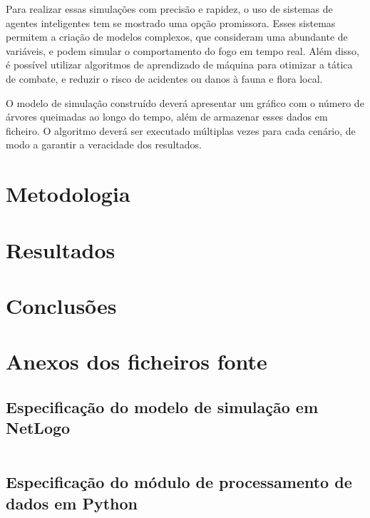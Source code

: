 \documentclass[a4paper, portuguese]{report}
\begin{document}
    Para realizar essas simulações com precisão e rapidez, o uso de sistemas de agentes inteligentes tem se mostrado uma opção promissora.
    Esses sistemas permitem a criação de modelos complexos, que consideram uma abundante de variáveis, e podem simular o comportamento do fogo em tempo real.
    Além disso, é possível utilizar algoritmos de aprendizado de máquina para otimizar a tática de combate, e reduzir o risco de acidentes ou danos à fauna e flora local.

    O modelo de simulação construído deverá apresentar um gráfico com o número de árvores queimadas ao longo do tempo, além de armazenar esses dados em ficheiro.
    O algoritmo deverá ser executado múltiplas vezes para cada cenário, de modo a garantir a veracidade dos resultados.


    \chapter{Metodologia}\label{ch:methodology}
    


    \chapter{Resultados}\label{ch:results}
    


    \chapter{Conclusões}\label{ch:conclusoes}
    

    \appendix


    \chapter{Anexos dos ficheiros fonte}\label{ch:appendix}


    \section{Especificação do modelo de simulação em NetLogo}\label{sec:model_spec}
    \inputminted[breaklines]{nl-lexer.py:NetLogoLexer -x}{../src/forest_fire.nlogo}


    \section{Especificação do módulo de processamento de dados em Python}\label{sec:data_proc}
\end{document}
